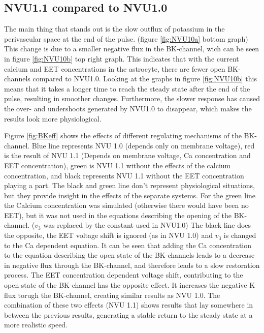 	
	\subsection{NVU1.1 compared to NVU1.0}
The main thing that stands out is the slow outflux of potassium in the perivascular space at the end of the pulse. (figure \ref{fig:NVU10a} bottom graph) This change is due to a smaller negative flux in the BK-channel, wich can be seen in figure \ref{fig:NVU10b} top right graph. This indicates that with the current calcium and EET  concentrations in the astrocyte, there are fewer open BK-channels compared to NVU1.0. Looking at the graphs in figure \ref{fig:NVU10b} this means that it takes a longer time to reach the steady state after the end of the pulse, resulting in smoother changes. Furthermore, the slower response has caused the over- and undershoots generated by NVU1.0 to disappear, which makes the results look more physiological. \cite{Hillman2011}

Figure \ref{fig:BKeff} shows the effects of different regulating mechanisms of the BK-channel. Blue line represents NVU 1.0 (depends only on membrane voltage), red is the result of NVU 1.1 (Depends on membrane voltage, \gls{Ca} concentration and EET concentration), green is NVU 1.1 without the effects of the calcium concentration, and black represents NVU 1.1 without the EET concentration playing a part. The black and green line don't represent physiological situations, but they provide insight in the effects of the separate systems. For the green line the Calcium concentration was simulated (otherwise there would have been no EET), but it was not used in the equations describing the opening of the BK-channel. ($v_3$ was replaced by the constant used in NVU1.0) The black line does the opposite, the EET voltage shift is ignored (as in NVU 1.0) and $v_3$ is changed to the \gls{Ca} dependent equation. It can be seen that adding the \gls{Ca} concentration to the equation describing the open state of the BK-channels leads to a decrease in negative flux through the BK-channel, and therefore leads to a slow restoration process. The EET concentration dependent voltage shift, contributing to the open state of the BK-channel has the opposite effect. It increases the negative \gls{K} flux torugh the BK-channel, creating similar results as NVU 1.0. The combination of these two effects (NVU 1.1) shows results that lay somewhere in between the previous results, generating a stable return to the steady state at a more realistic speed.
	
